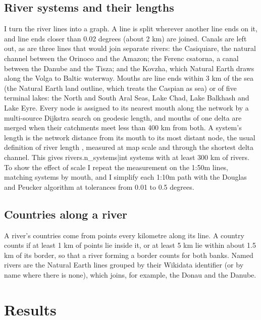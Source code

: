 \documentclass[11pt,a4paper]{article}
\begin{document}
\subsection{River systems and their lengths}
I turn the river lines into a graph. A line is split wherever another line ends on it, and line ends closer than 0.02 degrees (about 2 km) are joined. Canals are left out, as are three lines that would join separate rivers: the Casiquiare, the natural channel between the Orinoco and the Amazon; the Ferenc csatorna, a canal between the Danube and the Tisza; and the Kovzha, which Natural Earth draws along the Volga to Baltic waterway. Mouths are line ends within 3 km of the sea (the Natural Earth land outline, which treats the Caspian as sea) or of five terminal lakes: the North and South Aral Seas, Lake Chad, Lake Balkhash and Lake Eyre. Every node is assigned to its nearest mouth along the network by a multi-source Dijkstra search on geodesic length, and mouths of one delta are merged when their catchments meet less than 400 km from both. A system's length is the network distance from its mouth to its most distant node, the usual definition of river length \citep{brit_nile}, measured at map scale and through the shortest delta channel. This gives {{rivers.n_systems|int}} systems with at least 300 km of rivers. To show the effect of scale I repeat the measurement on the 1:50m lines, matching systems by mouth, and I simplify each 1:10m path with the Douglas and Peucker algorithm \citep{douglas1973} at tolerances from 0.01 to 0.5 degrees.

\subsection{Countries along a river}
A river's countries come from points every kilometre along its line. A country counts if at least 1 km of points lie inside it, or at least 5 km lie within about 1.5 km of its border, so that a river forming a border counts for both banks. Named rivers are the Natural Earth lines grouped by their Wikidata identifier (or by name where there is none), which joins, for example, the Donau and the Danube.

\section{Results}
\end{document}
